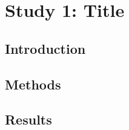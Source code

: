 \chapter{Study 1: Title}
\label{ch:study1}


\section{Introduction}
\label{sec:study1-introduction}

\section{Methods}
\label{sec:study1-methods}

\section{Results}
\label{sec:study1-results}

